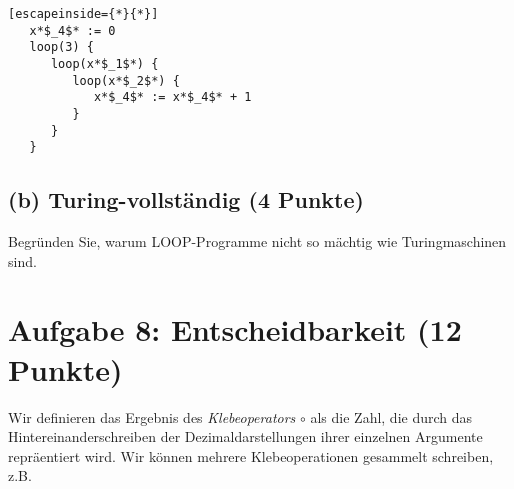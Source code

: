 \documentclass{scrartcl}
\begin{document}
\newsavebox{\mybox}
\begin{lrbox}{\mybox}
   \begin{lstlisting}[escapeinside={*}{*}]
   x*$_4$* := 0
   loop(3) {
      loop(x*$_1$*) {
         loop(x*$_2$*) {
            x*$_4$* := x*$_4$* + 1
         }
      }
   }
   \end{lstlisting}
\end{lrbox}

\noindent{}
\subsection*{(b) Turing-vollständig \hfill \normalfont (4 Punkte)}
Begründen Sie, warum LOOP-Programme nicht so mächtig wie Turingmaschinen sind.

\vspace{4pt}
\noindent{}

\pagebreak

\section*{Aufgabe 8: Entscheidbarkeit \hfill{} (12 Punkte)}

Wir definieren das Ergebnis des \emph{Klebeoperators} $\circ$ als die Zahl, die
durch das Hintereinanderschreiben der Dezimaldarstellungen ihrer einzelnen
Argumente repräentiert wird. Wir können mehrere Klebeoperationen gesammelt
schreiben, z.B.
\end{document}
